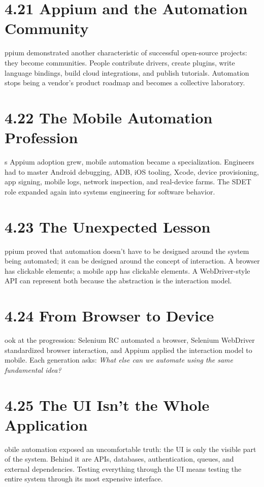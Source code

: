 \documentclass[11pt, a4paper, openany]{book}
\newcommand{\initialcap}[1]{{\fontfamily{lmss}\selectfont\huge\textbf{#1}}}
\begin{document}
\section{4.21 Appium and the Automation Community}
\noindent \initialcap{A}ppium demonstrated another characteristic of successful open-source projects: they become communities. People contribute drivers, create plugins, write language bindings, build cloud integrations, and publish tutorials. Automation stops being a vendor's product roadmap and becomes a collective laboratory.

\section{4.22 The Mobile Automation Profession}
\noindent \initialcap{A}s Appium adoption grew, mobile automation became a specialization. Engineers had to master Android debugging, ADB, iOS tooling, Xcode, device provisioning, app signing, mobile logs, network inspection, and real-device farms. The SDET role expanded again into systems engineering for software behavior.

\section{4.23 The Unexpected Lesson}
\noindent \initialcap{A}ppium proved that automation doesn't have to be designed around the system being automated; it can be designed around the concept of interaction. A browser has clickable elements; a mobile app has clickable elements. A WebDriver-style API can represent both because the abstraction is the interaction model.

\section{4.24 From Browser to Device}
\noindent \initialcap{L}ook at the progression: Selenium RC automated a browser, Selenium WebDriver standardized browser interaction, and Appium applied the interaction model to mobile. Each generation asks: \textit{What else can we automate using the same fundamental idea?}

\section{4.25 The UI Isn't the Whole Application}
\noindent \initialcap{M}obile automation exposed an uncomfortable truth: the UI is only the visible part of the system. Behind it are APIs, databases, authentication, queues, and external dependencies. Testing everything through the UI means testing the entire system through its most expensive interface.
\end{document}
